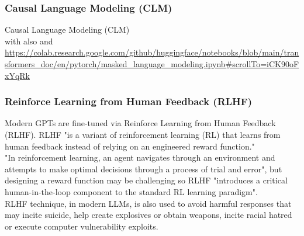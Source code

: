 \documentclass[12pt]{article}
\begin{document}
    	\subsubsection{Causal Language Modeling (CLM)}
Causal Language Modeling (CLM) \cite{vaswani2023attentionneed}\\
with also 
and \url{https://colab.research.google.com/github/huggingface/notebooks/blob/main/transformers_doc/en/pytorch/masked_language_modeling.ipynb#scrollTo=iCK90oFxYqRk}\\



        \subsubsection{Reinforce Learning from Human Feedback (RLHF)}

Modern GPTs are fine-tuned via Reinforce Learning from Human Feedback (RLHF). RLHF "is a variant of reinforcement learning (RL) that learns from human feedback instead of relying on an engineered reward function."\cite{kaufmann2024surveyreinforcementlearninghuman}\\ "In reinforcement learning, an agent navigates through an environment and attempts to make optimal decisions through a process of trial and error"\cite{kaufmann2024surveyreinforcementlearninghuman}, but designing a reward function may be challenging so RLHF "introduces a critical human-in-the-loop component to the standard RL learning paradigm".\cite{kaufmann2024surveyreinforcementlearninghuman}\\ RLHF technique, in modern LLMs, is also used to avoid harmful responses that may incite suicide, help create explosives or obtain weapons, incite racial hatred or execute computer vulnerability exploits.
\end{document}
